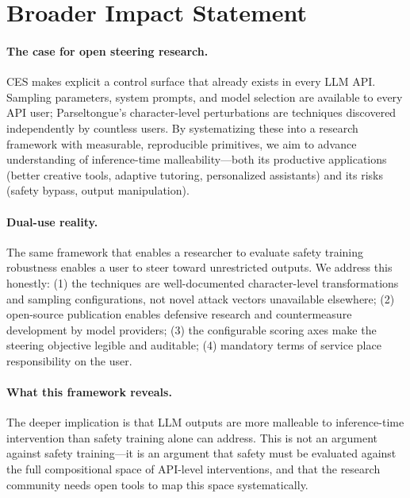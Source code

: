\documentclass[11pt]{article}
\begin{document}
\section*{Broader Impact Statement}

\paragraph{The case for open steering research.} CES makes explicit a control surface that already exists in every LLM API. Sampling parameters, system prompts, and model selection are available to every API user; Parseltongue's character-level perturbations are techniques discovered independently by countless users. By systematizing these into a research framework with measurable, reproducible primitives, we aim to advance understanding of inference-time malleability---both its productive applications (better creative tools, adaptive tutoring, personalized assistants) and its risks (safety bypass, output manipulation).

\paragraph{Dual-use reality.} The same framework that enables a researcher to evaluate safety training robustness enables a user to steer toward unrestricted outputs. We address this honestly: (1) the techniques are well-documented character-level transformations and sampling configurations, not novel attack vectors unavailable elsewhere; (2) open-source publication enables defensive research and countermeasure development by model providers; (3) the configurable scoring axes make the steering objective legible and auditable; (4) mandatory terms of service place responsibility on the user.

\paragraph{What this framework reveals.} The deeper implication is that LLM outputs are more malleable to inference-time intervention than safety training alone can address. This is not an argument against safety training---it is an argument that safety must be evaluated against the full compositional space of API-level interventions, and that the research community needs open tools to map this space systematically.
\end{document}
